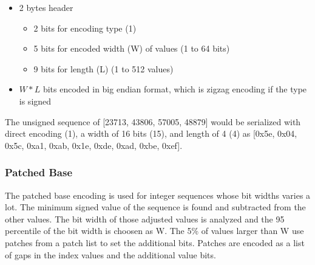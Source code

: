 \documentclass{article}
\begin{document}
\begin{itemize}
\item 2 bytes header
  \begin{itemize}
  \item 2 bits for encoding type (1)
  \item 5 bits for encoded width (W) of values (1 to 64 bits)
  \item 9 bits for length (L) (1 to 512 values)
  \end{itemize}
\item $W * L$ bits encoded in big endian format, which is
  zigzag encoding if the type is signed
\end{itemize}

The unsigned sequence of [23713, 43806, 57005, 48879] would be
serialized with direct encoding (1), a width of 16 bits (15), and
length of 4 (4) as [0x5e, 0x04, 0x5c, 0xa1, 0xab, 0x1e, 0xde, 0xad,
  0xbe, 0xef].

\subsubsection{Patched Base}

The patched base encoding is used for integer sequences whose bit
widths varies a lot. The minimum signed value of the sequence is found
and subtracted from the other values. The bit width of those adjusted
values is analyzed and the 95 percentile of the bit width is choosen
as W.  The 5\% of values larger than W use patches from a patch list
to set the additional bits. Patches are encoded as a list of gaps in
the index values and the additional value bits.
\end{document}
